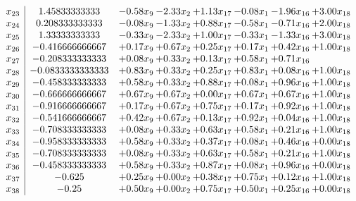 \documentclass[8pt]{article}
\begin{document}
\[\begin{array}{c| c c@{\hskip 2pt} c@{\hskip 2pt} c@{\hskip 2pt} c@{\hskip 2pt} c@{\hskip 2pt} c@{\hskip 2pt} }
 x_{23}   &  1.45833333333 & -0.58 x_{9} & -2.33 x_{2} & +  1.13 x_{17} & -0.08 x_{1} & -1.96 x_{16} & +  3.00 x_{18}\\
 x_{24}   &  0.208333333333 & -0.08 x_{9} & -1.33 x_{2} & +  0.88 x_{17} & -0.58 x_{1} & -0.71 x_{16} & +  2.00 x_{18}\\
 x_{25}   &  1.33333333333 & -0.33 x_{9} & -2.33 x_{2} & +  1.00 x_{17} & -0.33 x_{1} & -1.33 x_{16} & +  3.00 x_{18}\\
 x_{26}   &  -0.416666666667 & +  0.17 x_{9} & +  0.67 x_{2} & +  0.25 x_{17} & +  0.17 x_{1} & +  0.42 x_{16} & +  1.00 x_{18}\\
 x_{27}   &  -0.208333333333 & +  0.08 x_{9} & +  0.33 x_{2} & +  0.13 x_{17} & +  0.58 x_{1} & +  0.71 x_{16} &   \\
 x_{28}   &  -0.0833333333333 & +  0.83 x_{9} & +  0.33 x_{2} & +  0.25 x_{17} & +  0.83 x_{1} & +  0.08 x_{16} & +  1.00 x_{18}\\
 x_{29}   &  -0.458333333333 & +  0.58 x_{9} & +  0.33 x_{2} & +  0.88 x_{17} & +  0.08 x_{1} & +  0.96 x_{16} & +  1.00 x_{18}\\
 x_{30}   &  -0.666666666667 & +  0.67 x_{9} & +  0.67 x_{2} & +  0.00 x_{17} & +  0.67 x_{1} & +  0.67 x_{16} & +  1.00 x_{18}\\
 x_{31}   &  -0.916666666667 & +  0.17 x_{9} & +  0.67 x_{2} & +  0.75 x_{17} & +  0.17 x_{1} & +  0.92 x_{16} & +  1.00 x_{18}\\
 x_{32}   &  -0.541666666667 & +  0.42 x_{9} & +  0.67 x_{2} & +  0.13 x_{17} & +  0.92 x_{1} & +  0.04 x_{16} & +  1.00 x_{18}\\
 x_{33}   &  -0.708333333333 & +  0.08 x_{9} & +  0.33 x_{2} & +  0.63 x_{17} & +  0.58 x_{1} & +  0.21 x_{16} & +  1.00 x_{18}\\
 x_{34}   &  -0.958333333333 & +  0.58 x_{9} & +  0.33 x_{2} & +  0.37 x_{17} & +  0.08 x_{1} & +  0.46 x_{16} & +  0.00 x_{18}\\
 x_{35}   &  -0.708333333333 & +  0.08 x_{9} & +  0.33 x_{2} & +  0.63 x_{17} & +  0.58 x_{1} & +  0.21 x_{16} & +  1.00 x_{18}\\
 x_{36}   &  -0.458333333333 & +  0.58 x_{9} & +  0.33 x_{2} & +  0.87 x_{17} & +  0.08 x_{1} & +  0.96 x_{16} & +  0.00 x_{18}\\
 x_{37}   &  -0.625 & +  0.25 x_{9} & +  0.00 x_{2} & +  0.38 x_{17} & +  0.75 x_{1} & +  0.12 x_{16} & +  1.00 x_{18}\\
 x_{38}   &  -0.25 & +  0.50 x_{9} & +  0.00 x_{2} & +  0.75 x_{17} & +  0.50 x_{1} & +  0.25 x_{16} & +  0.00 x_{18}\\

\end{array}\]
\end{document}
